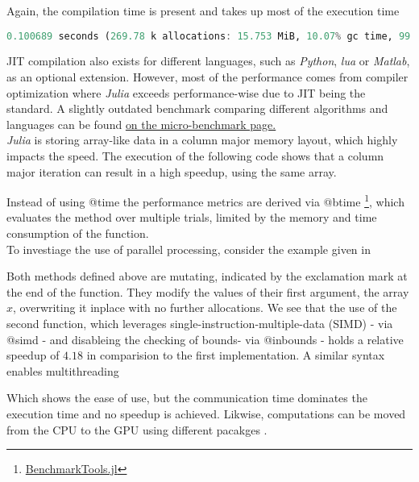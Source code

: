 Again, the compilation time is present and takes up most of the execution time

\begin{lstlisting}[language=Julia]
    0.100689 seconds (269.78 k allocations: 15.753 MiB, 10.07% gc time, 99.92% compilation time)
\end{lstlisting}

JIT compilation also exists for different languages, such as \textit{Python}, \textit{lua} or \textit{Matlab}\cite{JMMATLAB2010}, as an optional extension. However, most of the performance comes
from compiler optimization where \textit{Julia} exceeds performance-wise due to JIT being the standard. 
A slightly outdated benchmark comparing different algorithms and languages can be found \href{https://julialang.org/benchmarks/}{on the micro-benchmark page.}\\

\textit{Julia} is storing array-like data in a column major memory layout, which highly impacts the speed. The execution of the following
code shows that a column major iteration can result in a high speedup, using the same array. 



Instead of using @time the performance metrics are derived via @btime \footnote{\href{https://github.com/JuliaCI/BenchmarkTools.jl}{BenchmarkTools.jl}}, which evaluates the method over multiple trials, limited by the memory and time consumption of the function.\\

To investiage the use of parallel processing, consider the example given in \cite[p. 178 ff.]{JMSengupta2019}



Both methods defined above are mutating, indicated by the exclamation mark at the end of the function. They modify the values of their first argument, the array $x$, overwriting it inplace with no further allocations.
We see that the use of the second function, which leverages single-instruction-multiple-data (SIMD) - via {@simd} - and disableing the checking of bounds- via {@inbounds} - holds a relative speedup of $4.18$ in comparision to the first implementation. 
A similar syntax enables multithreading



Which shows the ease of use, but the communication time dominates the execution time and no speedup is achieved. Likwise, computations can be moved from the CPU to the GPU using different pacakges \cite[p.204 ff.]{JMSengupta2019}.

\newpage














